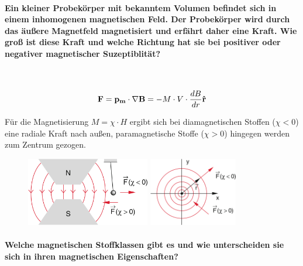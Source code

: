 \documentclass[a4paper, 11pt, parskip=half]{scrartcl}
\begin{document}
\paragraph{Ein kleiner Probekörper mit bekanntem Volumen befindet sich in einem inhomogenen
magnetischen Feld. Der Probekörper wird durch das äußere Magnetfeld magnetisiert und erfährt daher
eine Kraft. Wie groß ist diese Kraft und welche Richtung hat sie bei positiver oder negativer
magnetischer Suzeptiblität?} ~

\begin{equation}
    \bold{F} = \bold{p_m} \cdot \nabla \bold{B} = - M \cdot V \cdot \frac{dB}{dr} \bold{\hat{r}}
\end{equation}

Für die Magnetisierung $M = \chi \cdot H$ ergibt sich bei diamagnetischen Stoffen ($\chi < 0$) eine
radiale Kraft nach außen, paramagnetische Stoffe ($\chi > 0$) hingegen werden zum Zentrum gezogen.

\begin{figure}[H]
    \centering
    \begin{minipage}[b]{0.3\textwidth}
        \centering
        \includegraphics[height=3cm]{image/6/1.1}
    \end{minipage}
    \hspace{2cm}
    \begin{minipage}[b]{0.3\textwidth}
        \centering
        \includegraphics[height=3cm]{image/6/1.2}
    \end{minipage}
\end{figure}

\paragraph{Welche magnetischen Stoffklassen gibt es und wie unterscheiden sie sich in ihren
magnetischen Eigenschaften?} ~
\end{document}
